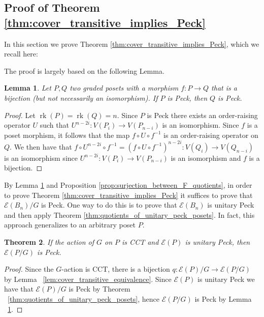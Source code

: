 \documentclass[10 pt]{amsart}
\theoremstyle{plain}
\newtheorem{thm}{Theorem}[section]
\newtheorem{lem}[thm]{Lemma}
\theoremstyle{definition}
\theoremstyle{remark}
\numberwithin{equation}{section}
\newcommand\ssec{\subsection}
\newcommand\rk{\operatorname{rk}}
\begin{document}
\ssec{Proof of Theorem \ref{thm:cover_transitive_implies_Peck}}\label{ssec:proof_of_cover_transitive_implies_Peck}

In this section we prove Theorem \ref{thm:cover_transitive_implies_Peck}, which we recall here:

\cctpeck*

The proof is largely based on the following Lemma.

\begin{lem}\label{lem:bijection_peck_implication}
Let $P,Q$ two graded posets with a morphism $f:P\rightarrow Q$ that is a bijection (but not necessarily an isomorphism). If $P$ is Peck, then $Q$ is Peck.
\end{lem}
\begin{proof}
Let $\rk(P) = \rk(Q) = n$.  Since $P$ is Peck there exists an order-raising operator $U$ such that $U^{n-2i}\colon V(P_i)\rightarrow V(P_{n-i})$ is an isomorphism.  Since $f$ is a poset morphism, it follows that the map $f\circ U\circ f^{-1}$ is an order-raising operator on $Q$.  We then have that $f\circ U^{n-2i}\circ f^{-1} = \left(f\circ U\circ f^{-1}\right)^{n-2i}\colon V(Q_i)\rightarrow V(Q_{n-i})$ is an isomorphism since $U^{n-2i}\colon V(P_i)\rightarrow V(P_{n-i})$ is an isomorphism and $f$ is a bijection.

\end{proof}

By Lemma \ref{lem:bijection_peck_implication} and Proposition \ref{prop:surjection_between_F_quotients}, in order to prove Theorem \ref{thm:cover_transitive_implies_Peck} it suffices to prove that $\mathcal E(B_n)/G$ is Peck.  One way to do this is to prove that $\mathcal E(B_n)$ is unitary Peck and then apply Theorem \ref{thm:quotients_of_unitary_peck_posets}.  In fact, this approach generalizes to an arbitrary poset $P$.

\begin{thm}
If the action of $G$ on $P$ is CCT and $\mathcal E(P)$ is unitary Peck, then $\mathcal E(P/G)$ is Peck.
\end{thm}
\begin{proof}
Since the $G$-action is CCT, there is a bijection $q\colon\mathcal{E}(P)/G \rightarrow \mathcal{E}(P/G)$ by Lemma ~\ref{lem:cover_transitive_equivalence}.  Since $\mathcal{E}(P)$ is unitary Peck we have that $\mathcal{E}(P)/G$ is Peck by Theorem ~\ref{thm:quotients_of_unitary_peck_posets}, hence $\mathcal{E}(P/G)$ is Peck by Lemma ~\ref{lem:bijection_peck_implication}.
\end{proof}
\end{document}
